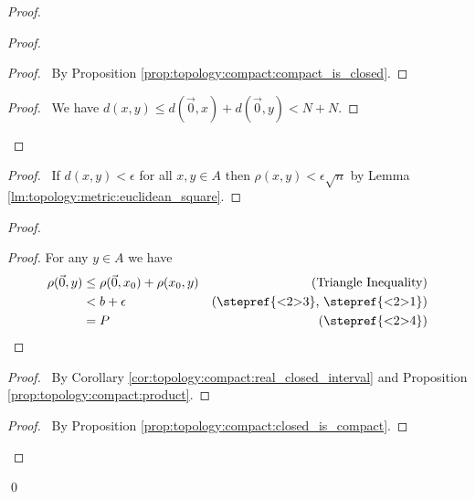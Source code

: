 \begin{proof}
  \pf
  \begin{proof}
    \begin{proof}
      \pf\ By Proposition \ref{prop:topology:compact:compact_is_closed}.
    \end{proof}
    \begin{proof}
      \pf\ We have $d(x, y) \leq d(\vec{0}, x) + d(\vec{0}, y) < N + N$.
    \end{proof}
  \end{proof}
  \begin{proof}
    \pf\ If $d(x, y) < \epsilon$ for all $x, y \in A$ then $\rho(x, y) <
    \epsilon \sqrt{n}$ by Lemma \ref{lm:topology:metric:euclidean_square}.
  \end{proof}
  \begin{proof}
    \begin{proof}
      \pf For any $y \in A$ we have
      \begin{align*}
        \rho(\vec{0}, y) & \leq \rho(\vec{0}, x_0)
        + \rho(x_0, y) & (\text{Triangle Inequality}) \\
        & < b + \epsilon & (\text{\stepref{<2>3}, \stepref{<2>1}}) \\
        & = P & (\text{\stepref{<2>4}})
      \end{align*}
    \end{proof}
    \begin{proof}
      \pf\ By Corollary \ref{cor:topology:compact:real_closed_interval} and
      Proposition \ref{prop:topology:compact:product}.
    \end{proof}
    \qedstep
    \begin{proof}
      \pf\ By Proposition \ref{prop:topology:compact:closed_is_compact}.
    \end{proof}
  \end{proof}
  \qed
\end{proof}

